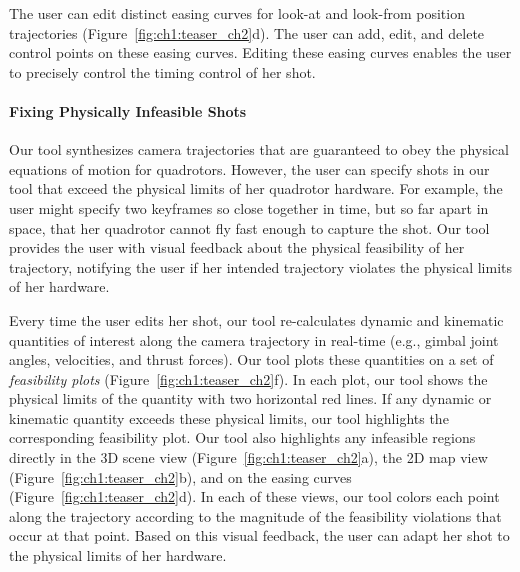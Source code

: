 The user can edit distinct easing curves for look-at and look-from position trajectories (Figure~\ref{fig:ch1:teaser_ch2}d).
The user can add, edit, and delete control points on these easing curves.
Editing these easing curves enables the user to precisely control the timing control of her shot.


\paragraph{Fixing Physically Infeasible Shots}

Our tool synthesizes camera trajectories that are guaranteed to obey the physical equations of motion for quadrotors. However, the user can specify shots in our tool that exceed the physical limits of her quadrotor hardware.
For example, the user might specify two keyframes so close together in time, but so far apart in space, that her quadrotor cannot fly fast enough to capture the shot.
Our tool provides the user with visual feedback about the physical feasibility of her trajectory, notifying the user if her intended trajectory violates the physical limits of her  hardware.

Every time the user edits her shot, our tool re-calculates dynamic and kinematic quantities of interest along the camera trajectory in real-time (e.g., gimbal joint angles, velocities, and thrust forces).
Our tool plots these quantities on a set of \emph{feasibility plots} (Figure~\ref{fig:ch1:teaser_ch2}f).
In each plot, our tool shows the physical limits of the quantity with two horizontal red lines.
If any dynamic or kinematic quantity exceeds these physical limits, our tool highlights the corresponding feasibility plot.
Our tool also highlights any infeasible regions directly in the 3D scene view (Figure~\ref{fig:ch1:teaser_ch2}a), the 2D map view (Figure~\ref{fig:ch1:teaser_ch2}b), and on the easing curves (Figure~\ref{fig:ch1:teaser_ch2}d).
In each of these views, our tool colors each point along the trajectory according to the magnitude of the feasibility violations that occur at that point.
Based on this visual feedback, the user can adapt her shot to the physical limits of her hardware.

